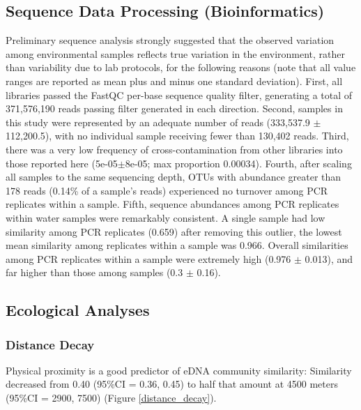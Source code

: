 \documentclass[11pt,letterpaper]{article} %
\begin{document}
\subsection*{Sequence Data Processing (Bioinformatics)}
Preliminary sequence analysis strongly suggested that the observed variation among environmental samples reflects true variation in the environment, rather than variability due to lab protocols, for the following reasons (note that all value ranges are reported as mean plus and minus one standard deviation). First, all libraries passed the FastQC per-base sequence quality filter, generating a total of 371,576,190 reads passing filter generated in each direction. Second, samples in this study were represented by an adequate number of reads (333,537.9 $\pm$ 112,200.5), with no individual sample receiving fewer than 130,402 reads. Third, there was a very low frequency of cross-contamination from other libraries into those reported here (5e-05$\pm$8e-05; max proportion 0.00034). Fourth, after scaling all samples to the same sequencing depth, OTUs with abundance greater than 178 reads (0.14\% of a sample's reads) experienced no turnover among PCR replicates within a sample. Fifth, sequence abundances among PCR replicates within water samples were remarkably consistent. A single sample had low similarity among PCR replicates (0.659) after removing this outlier, the lowest mean similarity among replicates within a sample was 0.966. Overall similarities among PCR replicates within a sample were extremely high (0.976 $\pm$ 0.013), and far higher than those among samples (0.3 $\pm$ 0.16).


\subsection*{Ecological Analyses}
\subsubsection*{Distance Decay}
Physical proximity is a good predictor of eDNA community similarity: Similarity decreased from 0.40 (95\%CI = 0.36, 0.45) to half that amount at 4500 meters (95\%CI = 2900, 7500) (Figure \ref{distance_decay}).
\end{document}
